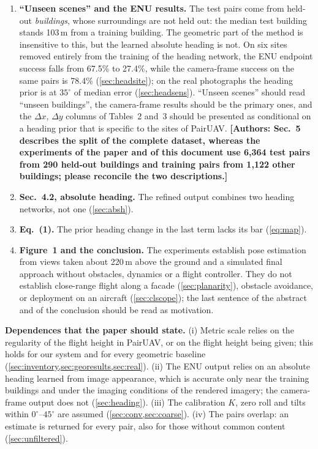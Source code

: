 \documentclass[10pt,twocolumn,letterpaper]{article}
\newcommand{\todoauthors}[1]{\textbf{\color{red}[Authors: #1]}}
\begin{document}
\begin{enumerate}[leftmargin=*,itemsep=2pt,topsep=3pt]
\item \textbf{``Unseen scenes'' and the ENU results.} The test pairs come from held-out \emph{buildings}, whose surroundings are not held out: the median test building stands 103\,m from a training building. The geometric part of the method is insensitive to this, but the learned absolute heading is not. On six sites removed entirely from the training of the heading network, the ENU endpoint success falls from 67.5\% to 27.4\%, while the camera-frame success on the same pairs is 78.4\% (\cref{sec:headsite}); on the real photographs the heading prior is at $35^\circ$ of median error (\cref{sec:headsens}). ``Unseen scenes'' should read ``unseen buildings'', the camera-frame results should be the primary ones, and the $\Delta x$, $\Delta y$ columns of Tables~2 and~3 should be presented as conditional on a heading prior that is specific to the sites of PairUAV. \todoauthors{Sec.~5 describes the split of the complete dataset, whereas the experiments of the paper and of this document use 6{,}364 test pairs from 290 held-out buildings and training pairs from 1{,}122 other buildings; please reconcile the two descriptions.}
\item \textbf{Sec.~4.2, absolute heading.} The refined output combines two heading networks, not one (\cref{sec:absh}).
\item \textbf{Eq.~(1).} The prior heading change in the last term lacks its bar (\cref{eq:map}).
\item \textbf{Figure~1 and the conclusion.} The experiments establish pose estimation from views taken about 220\,m above the ground and a simulated final approach without obstacles, dynamics or a flight controller. They do not establish close-range flight along a facade (\cref{sec:planarity}), obstacle avoidance, or deployment on an aircraft (\cref{sec:clscope}); the last sentence of the abstract and of the conclusion should be read as motivation.
\end{enumerate}

\noindent\textbf{Dependences that the paper should state.} (i) Metric scale relies on the regularity of the flight height in PairUAV, or on the flight height being given; this holds for our system and for every geometric baseline (\cref{sec:inventory,sec:georesults,sec:real}). (ii) The ENU output relies on an absolute heading learned from image appearance, which is accurate only near the training buildings and under the imaging conditions of the rendered imagery; the camera-frame output does not (\cref{sec:heading}). (iii) The calibration $K$, zero roll and tilts within $0^\circ$--$45^\circ$ are assumed (\cref{sec:conv,sec:coarse}). (iv) The pairs overlap: an estimate is returned for every pair, also for those without common content (\cref{sec:unfiltered}).
\end{document}
